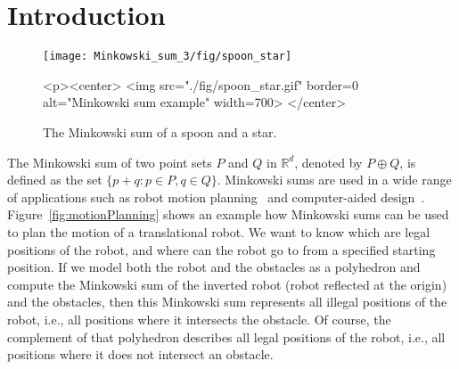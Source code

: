 
\ccParDims




\section{Introduction}

\begin{figure}[h]
  \begin{ccTexOnly}
    \begin{center}
      \texttt{[image: Minkowski\_sum\_3/fig/spoon\_star]}
    \end{center}
  \end{ccTexOnly}
  \begin{ccHtmlOnly}
    <p><center>
    <img src="./fig/spoon_star.gif" border=0 alt="Minkowski sum
    example" width=700>
    </center>
  \end{ccHtmlOnly}
  \caption{The Minkowski sum of a spoon and a star.}
  \label{fig:spoonStar}
\end{figure}

The Minkowski sum of two point sets $P$ and $Q$ in $\mathbb{R}^d$, denoted by
$P \oplus Q$, is defined as the set $\{p+q:p \in P, q \in Q
\}$. Minkowski sums are used in a wide range of applications such as
robot motion planning~\cite{l-rmp-91} and computer-aided
design~\cite{cgal:ek-sicad-99}. Figure~\ref{fig:motionPlanning} shows
an example how Minkowski sums can be used to plan the motion of a
translational robot. We want to know which are legal positions of the
robot, and where can the robot go to from a specified starting
position. If we model both the robot and the obstacles as a polyhedron
and compute the Minkowski sum of the inverted robot (robot reflected
at the origin) and the obstacles, then this Minkowski sum represents
all illegal positions of the robot, i.e., all positions where it
intersects the obstacle. Of course, the complement of that polyhedron
describes all legal positions of the robot, i.e., all positions where
it does not intersect an obstacle.


